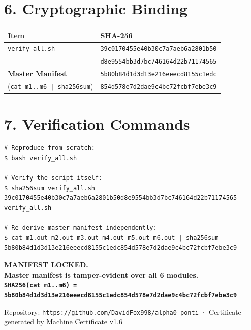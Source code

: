 \documentclass[11pt,letterpaper]{article}
\begin{document}
\section*{6. Cryptographic Binding}

\begin{center}
\begin{tabular}{|l|l|}
\hline
\textbf{Item} & \textbf{SHA-256} \\
\hline
\texttt{verify\_all.sh} & \texttt{39c0170455e40b30c7a7aeb6a2801b50} \\
 & \texttt{d8e9554bb3d7bc746164d22b71174565} \\
\hline
\textbf{Master Manifest} & \texttt{5b80b84d1d3d13e216eeecd8155c1edc} \\
(\texttt{cat m1..m6 | sha256sum}) & \texttt{854d578e7d2dae9c4bc72fcbf7ebe3c9} \\
\hline
\end{tabular}
\end{center}

\section*{7. Verification Commands}

\begin{lstlisting}
# Reproduce from scratch:
$ bash verify_all.sh

# Verify the script itself:
$ sha256sum verify_all.sh
39c0170455e40b30c7a7aeb6a2801b50d8e9554bb3d7bc746164d22b71174565  verify_all.sh

# Re-derive master manifest independently:
$ cat m1.out m2.out m3.out m4.out m5.out m6.out | sha256sum
5b80b84d1d3d13e216eeecd8155c1edc854d578e7d2dae9c4bc72fcbf7ebe3c9  -
\end{lstlisting}

\vspace{1em}
\begin{center}
\Large\bfseries MANIFEST LOCKED.\\[4pt]
\normalsize Master manifest is tamper-evident over all 6 modules.\\[2pt]
\texttt{SHA256(cat m1..m6) = 5b80b84d1d3d13e216eeecd8155c1edc854d578e7d2dae9c4bc72fcbf7ebe3c9}
\end{center}

\vspace{0.5em}
\noindent\small Repository: \texttt{https://github.com/DavidFox998/alpha0-ponti} ·
Certificate generated by Machine Certificate v1.6
\end{document}
